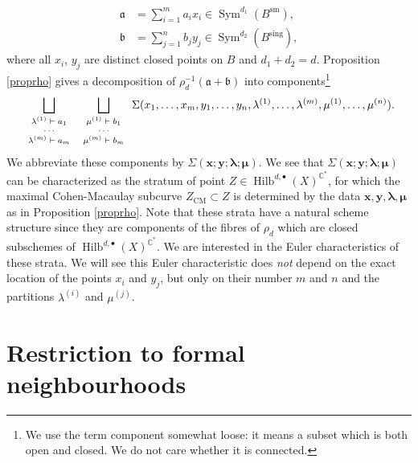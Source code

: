 \documentclass{amsart}
\theoremstyle{definition}
\newcommand{\CC} {\mathbb{C}}          %
\newcommand{\Sym}{\operatorname{Sym}}
\newcommand{\Hilb}{\operatorname{Hilb}}
\newcommand{\CM}{\operatorname{CM}}
\newcommand{\sm}{\operatorname{sm}}
\newcommand{\sing}{\operatorname{sing}}
\begin{document}
\begin{align*}
\mathfrak{a} &= \sum_{i=1}^{m} a_i x_i \in \Sym^{d_1}(B^{\sm}), \\
\mathfrak{b} &= \sum_{j=1}^{n} b_j y_j \in \Sym^{d_2}(B^{\sing}),
\end{align*}
where all $x_i$, $y_j$ are distinct closed points on $B$ and $d_1+d_2=d$. Proposition \ref{proprho} gives a decomposition of $\rho_{d}^{-1} ( \mathfrak{a} + \mathfrak{b} )$ into components\footnote{We use the term component somewhat loose: it means a subset which is both open and closed. We do not care whether it is connected.}
\begin{equation} \label{comps}
\bigsqcup_{{\scriptsize{\begin{array}{c} \lambda^{(1)} \vdash a_1 \\ \cdots \\ \lambda^{(m)} \vdash a_m \end{array}}}} \bigsqcup_{\scriptsize{\begin{array}{c} \mu^{(1)} \vdash b_1 \\ \cdots \\ \mu^{(m)} \vdash b_m \end{array}}} \Sigma(x_1, \ldots, x_m, y_1, \ldots, y_n, \lambda^{(1)}, \ldots, \lambda^{(m)}, \mu^{(1)}, \ldots, \mu^{(n)}).
\end{equation}
We abbreviate these components by $\Sigma(\boldsymbol{x};\boldsymbol{y};\boldsymbol{\lambda};\boldsymbol{\mu})$. We see that $\Sigma(\boldsymbol{x};\boldsymbol{y};\boldsymbol{\lambda};\boldsymbol{\mu})$ can be characterized as the stratum of point $Z \in \Hilb^{d,\bullet}(X)^{\CC^*}$, for which the maximal Cohen-Macaulay subcurve $Z_{\CM} \subset Z$ is determined by the data $\boldsymbol{x}, \boldsymbol{y}, \boldsymbol{\lambda}, \boldsymbol{\mu}$ as in Proposition \ref{proprho}. Note that these strata have a natural scheme structure since they are components of the fibres of $\rho_d$ which are closed subschemes of $\Hilb^{d, \bullet}(X)^{\CC^*}$. We are interested in the Euler characteristics of these strata. We will see this Euler characteristic does \emph{not} depend on the exact location of the points $x_i$ and $y_j$, but only on their number $m$ and $n$ and the partitions $\lambda^{(i)}$ and $\mu^{(j)}$.


\section{Restriction to formal neighbourhoods} \label{formal}
\end{document}
